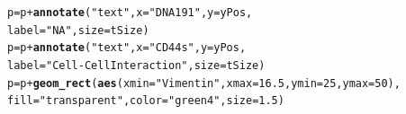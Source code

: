 \documentclass[a4paper]{article}\usepackage[]{graphicx}\usepackage[]{color}
\makeatletter
\newcommand{\hlnum}[1]{\textcolor[rgb]{0.686,0.059,0.569}{#1}}%
\newcommand{\hlstr}[1]{\textcolor[rgb]{0.192,0.494,0.8}{#1}}%
\newcommand{\hlopt}[1]{\textcolor[rgb]{0,0,0}{#1}}%
\newcommand{\hlstd}[1]{\textcolor[rgb]{0.345,0.345,0.345}{#1}}%
\newcommand{\hlkwb}[1]{\textcolor[rgb]{0.69,0.353,0.396}{#1}}%
\newcommand{\hlkwc}[1]{\textcolor[rgb]{0.333,0.667,0.333}{#1}}%
\newcommand{\hlkwd}[1]{\textcolor[rgb]{0.737,0.353,0.396}{\textbf{#1}}}%
\newenvironment{kframe}{%
 \def\at@end@of@kframe{}%
 \ifinner\ifhmode%
  \def\at@end@of@kframe{\end{minipage}}%
  \begin{minipage}{\columnwidth}%
 \fi\fi%
 \def\FrameCommand##1{\hskip\@totalleftmargin \hskip-\fboxsep
 \colorbox{shadecolor}{##1}\hskip-\fboxsep
     \hskip-\linewidth \hskip-\@totalleftmargin \hskip\columnwidth}%
 \MakeFramed {\advance\hsize-\width
   \@totalleftmargin\z@ \linewidth\hsize
   \@setminipage}}%
 {\par\unskip\endMakeFramed%
 \at@end@of@kframe}
\newenvironment{knitrout}{}{} %
\makeatother
\begin{document}
\begin{knitrout}
\begin{kframe}
\begin{alltt}
\hlstd{p} \hlkwb{=} \hlstd{p} \hlopt{+} \hlkwd{annotate}\hlstd{(}\hlstr{"text"}\hlstd{,} \hlkwc{x} \hlstd{=} \hlstr{"DNA191"}\hlstd{,} \hlkwc{y} \hlstd{= yPos,}
                       \hlkwc{label} \hlstd{=} \hlstr{"NA"}\hlstd{,} \hlkwc{size} \hlstd{= tSize)}
\hlstd{p} \hlkwb{=} \hlstd{p} \hlopt{+} \hlkwd{annotate}\hlstd{(}\hlstr{"text"}\hlstd{,} \hlkwc{x} \hlstd{=} \hlstr{"CD44s"}\hlstd{,} \hlkwc{y} \hlstd{= yPos,}
                       \hlkwc{label} \hlstd{=} \hlstr{"Cell-Cell Interaction"}\hlstd{,} \hlkwc{size} \hlstd{= tSize)}
\hlstd{p} \hlkwb{=} \hlstd{p} \hlopt{+} \hlkwd{geom_rect}\hlstd{(}\hlkwd{aes}\hlstd{(}\hlkwc{xmin} \hlstd{=} \hlstr{"Vimentin"}\hlstd{,} \hlkwc{xmax} \hlstd{=} \hlnum{16.5}\hlstd{,} \hlkwc{ymin} \hlstd{=} \hlnum{25}\hlstd{,} \hlkwc{ymax} \hlstd{=} \hlnum{50}\hlstd{),}
               \hlkwc{fill} \hlstd{=} \hlstr{"transparent"}\hlstd{,} \hlkwc{color} \hlstd{=} \hlstr{"green4"}\hlstd{,} \hlkwc{size} \hlstd{=} \hlnum{1.5}\hlstd{)}


\end{alltt}
\end{kframe}
\end{knitrout}
\end{document}
